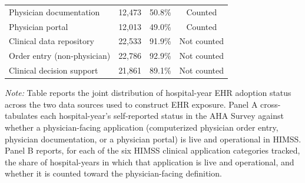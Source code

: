 \begin{table}[!h]
\begin{threeparttable}
\begin{tabular}[t]{lrrc}
\hspace{1em}\quad Physician documentation & 12,473 & 50.8\% & Counted\\
\hspace{1em}\quad Physician portal & 12,013 & 49.0\% & Counted\\
\hspace{1em}\quad Clinical data repository & 22,533 & 91.9\% & Not counted\\
\hspace{1em}\quad Order entry (non-physician) & 22,786 & 92.9\% & Not counted\\
\hspace{1em}\quad Clinical decision support & 21,861 & 89.1\% & Not counted\\
\bottomrule
\end{tabular}
\begin{tablenotes}
\item \textit{Note: } Table reports the joint distribution of hospital-year EHR adoption status across the two data sources used to construct EHR exposure. Panel A cross-tabulates each hospital-year's self-reported status in the AHA Survey against whether a physician-facing application (computerized physician order entry, physician documentation, or a physician portal) is live and operational in HIMSS. Panel B reports, for each of the six HIMSS clinical application categories tracked, the share of hospital-years in which that application is live and operational, and whether it is counted toward the physician-facing definition.
\end{tablenotes}
\end{threeparttable}
\end{table}
